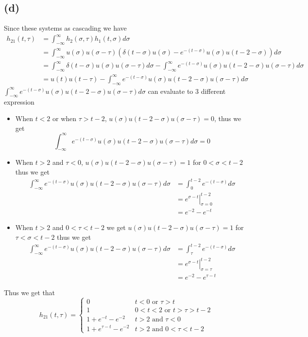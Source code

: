 \documentclass[12pt]{article}
\begin{document}
\subsection*{(d)}
Since these systems as cascading we have
\begin{align*}
h_{21}(t,\tau)&=\int_{-\infty}^{\infty}h_2(\sigma,\tau)h_1(t,\sigma)d\sigma\\
&=\int_{-\infty}^{\infty}u(\sigma)u(\sigma-\tau)(\delta(t-\sigma)u(\sigma)-e^{-(t-\sigma)}u(\sigma)u(t-2-\sigma))d\sigma\\
&=\int_{-\infty}^{\infty}\delta(t-\sigma)u(\sigma)u(\sigma-\tau)d\sigma-\int_{-\infty}^{\infty}e^{-(t-\sigma)}u(\sigma)u(t-2-\sigma)u(\sigma-\tau)d\sigma\\
&=u(t)u(t-\tau)-\int_{-\infty}^{\infty}e^{-(t-\sigma)}u(\sigma)u(t-2-\sigma)u(\sigma-\tau)d\sigma
\end{align*}
$\int_{-\infty}^{\infty}e^{-(t-\sigma)}u(\sigma)u(t-2-\sigma)u(\sigma-\tau)d\sigma$ can evaluate to 3 different expression
\begin{itemize}
\item When $t<2$ or when $\tau>t-2$, $u(\sigma)u(t-2-\sigma)u(\sigma-\tau)=0$, thus we get
$$\int_{-\infty}^{\infty}e^{-(t-\sigma)}u(\sigma)u(t-2-\sigma)u(\sigma-\tau)d\sigma=0$$
\item When $t>2$ and $\tau<0$, $u(\sigma)u(t-2-\sigma)u(\sigma-\tau)=1$ for $0<\sigma<t-2$ thus we get
\begin{align*}
\int_{-\infty}^{\infty}e^{-(t-\sigma)}u(\sigma)u(t-2-\sigma)u(\sigma-\tau)d\sigma&=\int_{0}^{t-2}e^{-(t-\sigma)}d\sigma\\
&=\left.e^{\sigma-t}\right|_{\sigma=0}^{t-2}\\
&=e^{-2}-e^{-t}
\end{align*}
\item When $t>2$ and $0<\tau<t-2$ we get $u(\sigma)u(t-2-\sigma)u(\sigma-\tau)=1$ for $\tau<\sigma<t-2$ thus we get
\begin{align*}
\int_{-\infty}^{\infty}e^{-(t-\sigma)}u(\sigma)u(t-2-\sigma)u(\sigma-\tau)d\sigma&=\int_{\tau}^{t-2}e^{-(t-\sigma)}d\sigma\\
&=\left.e^{\sigma-t}\right|_{\sigma=\tau}^{t-2}\\
&=e^{-2}-e^{\tau-t}
\end{align*}
\end{itemize}

Thus we get that
$$h_{21}(t,\tau)=\boxed{\begin{cases}
0 & t<0 \text{ or } \tau>t\\
1 & 0<t<2 \text{ or } t>\tau>t-2\\
1+e^{-t}-e^{-2} & t>2 \text{ and } \tau<0\\
1+e^{\tau-t}-e^{-2} & t>2 \text{ and } 0<\tau<t-2
\end{cases}}$$
\end{document}
